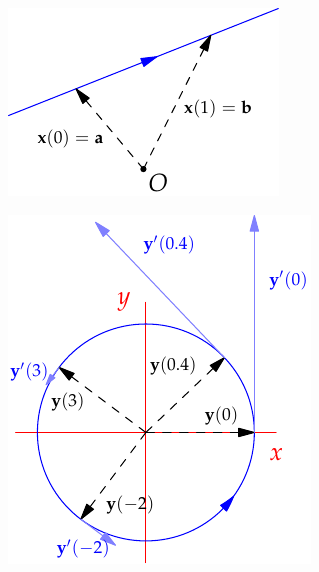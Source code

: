 \begin{minipage}[t]{0.3\linewidth}\vspace{0pt}
	\flushright \includegraphics{curves-line}\par
	\flushright	\href{http://www.math.uci.edu/~ndonalds/math162a/curves-animcircle.html}{\includegraphics{curves-animcircle2}}
\end{minipage}

\clearpage


